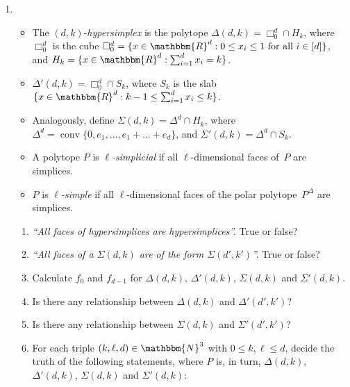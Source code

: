 \documentclass[11pt]{amsart}
\newcommand{\N}{\mathbbm{N}}
\newcommand{\R}{\mathbbm{R}}
\DeclareMathOperator{\conv}{conv}
\begin{document}
\begin{enumerate}
\setlength{\itemsep}{1ex}
\item 
    \begin{itemize}
    \item The $(d,k)$-\emph{hypersimplex} is the polytope $\Delta(d,k)=\Box_0^d\cap H_k$, where $\Box_0^d$ is the cube $\Box_0^d = \{x\in\R^d: 0\le x_i\le 1\text{ for all }i\in[d]\}$, and
$H_k=\{x\in\R^d:\sum_{i=1}^d x_i = k\}$.
\item $\Delta'(d,k)=\Box_0^d\cap S_k$, where $S_k$ is the slab $\{x\in\R^d : k-1\le\sum_{i=1}^d x_i \le k\}$.
\item Analogously, define $\Sigma(d,k)=\Delta^d\cap H_k$, where $\Delta^d=\conv\{0,e_1,\dots,e_1+\dots+e_d\}$, and $\Sigma'(d,k) = \Delta^d\cap S_k$.
\item A polytope $P$ is \emph{$\ell$-simplicial} if all $\ell$-dimensional faces of~$P$ are simplices.
\item $P$ is \emph{$\ell$-simple} if all $\ell$-dimensional faces of the polar polytope~$P^\Delta$ are simplices.
    \end{itemize}


\bigskip
\begin{enumerate}
\setlength{\itemsep}{1ex}
\item \emph{``All faces of hypersimplices are hypersimplices''.} True or false? 

\item \emph{``All faces of a $\Sigma(d,k)$ are of the form $\Sigma(d',k')$''.} True or false? 

\item Calculate $f_0$ and $f_{d-1}$ for $\Delta(d,k)$, $\Delta'(d,k)$, $\Sigma(d,k)$ and $\Sigma'(d,k)$.

\item Is there any relationship between $\Delta(d,k)$ and $\Delta'(d',k')$?

\item Is there any relationship between $\Sigma(d,k)$ and $\Sigma'(d',k')$?

\item For each triple $(k,\ell,d)\in\N^3$ with $0\le k,\ell\le d$, decide the truth of the following statements, where $P$ is, in turn, $\Delta(d,k)$, $\Delta'(d,k)$, $\Sigma(d,k)$ and $\Sigma'(d,k)$:



\end{enumerate}
\end{enumerate}
\end{document}
